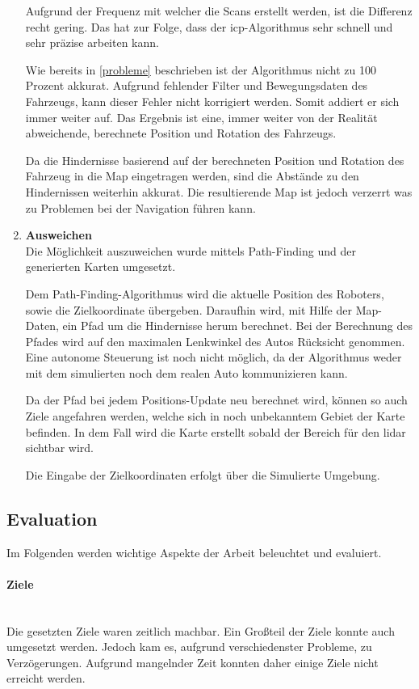 \begin{enumerate}[leftmargin=*]
    Aufgrund der Frequenz mit welcher die Scans erstellt werden, ist die Differenz recht gering.
    Das hat zur Folge, dass der \ac{icp}-Algorithmus sehr schnell und sehr präzise arbeiten kann.
    
    Wie bereits in \ref{probleme} beschrieben ist der Algorithmus nicht zu 100 Prozent akkurat.
    Aufgrund fehlender Filter und Bewegungsdaten des Fahrzeugs, kann dieser Fehler nicht korrigiert werden.
    Somit addiert er sich immer weiter auf.
    Das Ergebnis ist eine, immer weiter von der Realität abweichende, berechnete Position und Rotation des Fahrzeugs.

    Da die Hindernisse basierend auf der berechneten Position und Rotation des Fahrzeug in die Map eingetragen werden,
    sind die Abstände zu den Hindernissen weiterhin akkurat.
    Die resultierende Map ist jedoch verzerrt was zu Problemen bei der Navigation führen kann.

    \item \textbf{Ausweichen} \\
    Die Möglichkeit auszuweichen wurde mittels Path-Finding und der generierten Karten umgesetzt.
    
    Dem Path-Finding-Algorithmus wird die aktuelle Position des Roboters, sowie die Zielkoordinate übergeben.
    Daraufhin wird, mit Hilfe der Map-Daten, ein Pfad um die Hindernisse herum berechnet.
    Bei der Berechnung des Pfades wird auf den maximalen Lenkwinkel des Autos Rücksicht genommen.
    Eine autonome Steuerung ist noch nicht möglich, da der Algorithmus weder mit dem simulierten noch dem realen Auto kommunizieren kann.

    Da der Pfad bei jedem Positions-Update neu berechnet wird, können so auch Ziele angefahren werden,
    welche sich in noch unbekanntem Gebiet der Karte befinden.
    In dem Fall wird die Karte erstellt sobald der Bereich für den \ac{lidar} sichtbar wird.

    Die Eingabe der Zielkoordinaten erfolgt über die Simulierte Umgebung.
\end{enumerate}

\subsection{Evaluation}
Im Folgenden werden wichtige Aspekte der Arbeit beleuchtet und evaluiert.

\paragraph{Ziele} \mbox{}\\
Die gesetzten Ziele waren zeitlich machbar.
Ein Großteil der Ziele konnte auch umgesetzt werden.
Jedoch kam es, aufgrund verschiedenster Probleme, zu Verzögerungen.
Aufgrund mangelnder Zeit konnten daher einige Ziele nicht erreicht werden.

